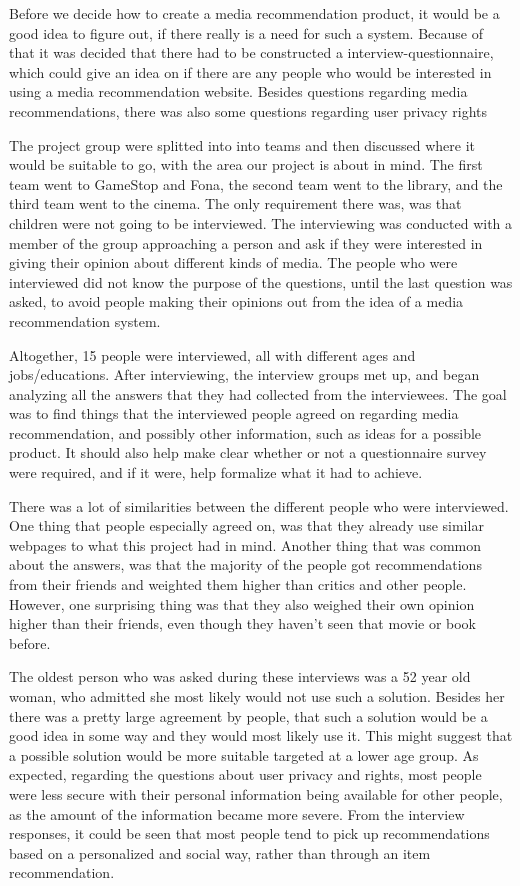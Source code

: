 Before we decide how to create a media recommendation product, it would be a good idea to figure out, if there really is a need for such a system. Because of that it was decided that there had to be constructed a interview-questionnaire, which could give an idea on if there are any people who would be interested in using a media recommendation website. Besides questions regarding media recommendations, there was also some questions regarding user privacy rights

The project group were splitted into into teams and then discussed where it would be suitable to go, with the area our project is about in mind. The first team went to GameStop and Fona, the second team went to the library, and the third team went to the cinema. The only requirement there was, was that children were not going to be interviewed. The interviewing was conducted with a member of the group approaching a person and ask if they were interested in giving their opinion about different kinds of media. The people who were interviewed did not know the purpose of the questions, until the last question was asked, to avoid people making their opinions out from the idea of a media recommendation system. 

Altogether, 15 people were interviewed, all with different ages and jobs/educations. After interviewing, the interview groups met up, and began analyzing all the answers that they had collected from the interviewees. The goal was to find things that the interviewed people agreed on regarding media recommendation, and possibly other information, such as ideas for a possible product. It should also help make clear whether or not a questionnaire survey were required, and if it were, help formalize what it had to achieve.

There was a lot of similarities between the different people who were interviewed. One thing that people especially agreed on, was that they already use similar webpages to what this project had in mind. Another thing that was common about the answers, was that the majority of the people got recommendations from their friends and weighted them higher than critics and other people. However, one surprising thing was that they also weighed their own opinion higher than their friends, even though they haven’t seen that movie or book before. 

The oldest person who was asked during these interviews was a 52 year old woman, who admitted she most likely would not use such a solution. Besides her there was a pretty large agreement by people, that such a solution would be a good idea in some way and they would most likely use it. This might suggest that a possible solution would be more suitable targeted at a lower age group. As expected, regarding the questions about user privacy and rights, most people were less secure with their personal information being available for other people, as the amount of the information became more severe. From the interview responses, it could be seen that most people tend to pick up recommendations based on a personalized and social way, rather than through an item recommendation. 

